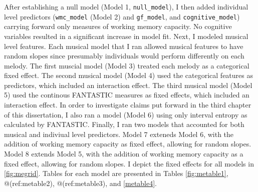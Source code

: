\documentclass[12pt,]{book}
\begin{document}
After establishing a null model (Model 1, \texttt{null\_model}), I then added individual level predictors (\texttt{wmc\_model} (Model 2) and \texttt{gf\_model}, and \texttt{cognitive\_model}) carrying forward only measures of working memory capacity.
No cognitive variables resulted in a significant increase in model fit.
Next, I modeled musical level features.
Each musical model that I ran allowed musical features to have random slopes since presumably individuals would perform differently on each melody.
The first muscial model (Model 3) treated each melody as a categorical fixed effect.
The second musical model (Model 4) used the categorical features as predictors, which included an interaction effect.
The third musical model (Model 5) used the continous FANTASTIC measures as fixed effects, which included an interaction effect.
In order to investigate claims put forward in the third chapter of this dissertation, I also ran a model (Model 6) using only interval entropy as calculated by FANTASTIC.
Finally, I ran two models that accounted for both musical and indiviual level predictors.
Model 7 exteneds Model 6, with the addition of working memory capacity as fixed effect, allowing for random slopes.
Model 8 extends Model 5, with the addition of working memory capacity as a fixed effect, allowing for random slopes.
I depict the fixed effects for all models in \ref{fig:megrid}.
Tables for each model are presented in Tables \ref{fig:metable1}, @(ref:metable2), @(ref:metable3), and \ref{metable4}.
\end{document}
